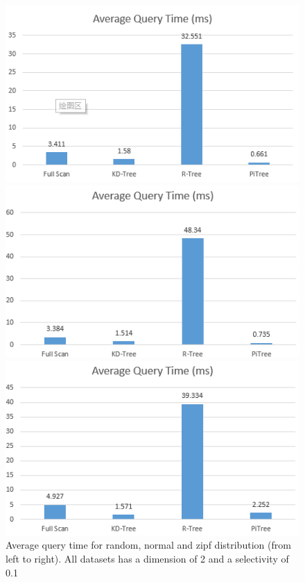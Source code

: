 \documentclass[sigconf,10pt]{acmart}
\begin{document}
\begin{figure}[ht] 
  \label{overall-performance-qtime} 
  \begin{minipage}[b]{0.33\linewidth}
    \centering
    \includegraphics[width=.8\linewidth]{../figures/overall-performance/random-qtime} 
    \vspace{4ex}
  \end{minipage}%
  \begin{minipage}[b]{0.33\linewidth}
    \centering
    \includegraphics[width=.8\linewidth]{../figures/overall-performance/normal-qtime} 
    \vspace{4ex}
  \end{minipage}%
  \begin{minipage}[b]{0.33\linewidth}
    \centering
    \includegraphics[width=.8\linewidth]{../figures/overall-performance/zipf-qtime} 
    \vspace{4ex}
  \end{minipage}
  \caption{Average query time for random, normal and zipf distribution (from left to right). 
  All datasets has a dimension of 2 and a selectivity of 0.1}
\end{figure}
\end{document}
